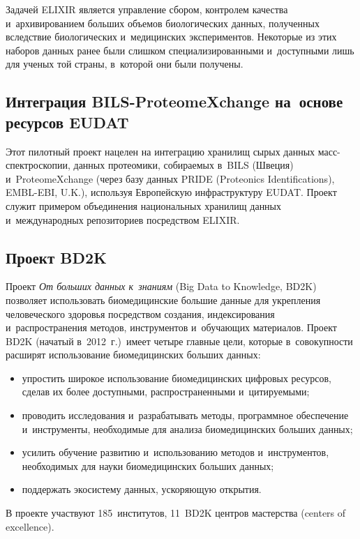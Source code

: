\begin{multicols}{2}
  Задачей ELIXIR является управление сбором, контролем качества и~архивированием 
больших объемов биологических данных, полученных вследствие биологических 
и~медицинских экспериментов. Некоторые из этих наборов данных ранее были слишком 
специализированными и~доступными лишь для ученых той страны, в~которой они были 
получены.

\subsection{Интеграция BILS-ProteomeXchange на~основе ресурсов EUDAT}
 
  Этот пилотный проект нацелен на интеграцию хранилищ сырых данных  
масс-спектроскопии, данных протеомики, собираемых в~BILS (Швеция) 
и~ProteomeXchange (через базу данных PRIDE (Proteonics Identifications), EMBL-EBI, U.K.), используя Европейскую 
инфраструктуру EUDAT. Проект служит примером объединения национальных хранилищ 
данных и~международных репозиториев посредством ELIXIR.
  
\subsection{Проект BD2K}

  Проект \textit{От больших данных к~знаниям} (Big Data to Knowledge, BD2K) позволяет 
использовать биомедицинские большие данные для укрепления человеческого здоровья 
посредством создания, индексирования и~распространения методов, инструментов 
и~обучающих материалов. Проект BD2K (начатый в~2012~г.)\ имеет четыре главные цели, 
которые в~совокупности расширят использование биомедицинских больших данных:
  \begin{itemize}
\item упростить широкое использование биомедицинских цифровых ресурсов, сделав их 
более доступными, распространенными и~цити\-ру\-емыми;
\item проводить исследования и~разрабатывать методы, программное обеспечение 
и~инструменты, необходимые для анализа биомедицинских больших данных;
\item усилить обучение развитию и~использованию методов и~инструментов, необходимых 
для нау\-ки биомедицинских больших данных;
\item поддержать экосистему данных, ускоряющую открытия.
\end{itemize}

В проекте участвуют 185~институтов, 11~BD2K центров мастерства (centers of excellence).


\end{multicols}
